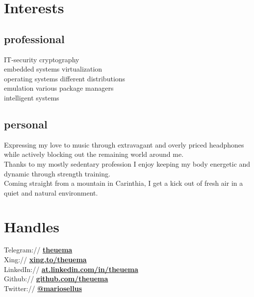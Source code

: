 \documentclass[]{resume}
\begin{document}
\begin{minipage}[t]{0.33\textwidth}
\section{Interests} 
	\subsection{professional}
	IT-security \textbullet{} cryptography\\
	embedded systems \textbullet{} virtualization\\
	operating systems \textbullet{} different distributions\\
	emulation \textbullet{} various package managers\\
	intelligent systems
	\sectionsep

	\subsection{personal}
	Expressing my love to music through extravagant and overly priced headphones while actively blocking out the remaining world around me. \\ \sectionsep
	Thanks to my mostly sedentary profession I enjoy keeping my body energetic and dynamic through strength training. \\ \sectionsep 
	Coming straight from a mountain in Carinthia, I get a kick out of fresh air in a quiet and natural environment. 
	\sectionsep
\section{Handles} 
	Telegram:// \href{https://telegram.me/theuema}{\textbf{theuema}} \\ \smallsep 
	Xing:// \href{https://www.xing.com/profile/Mario_Theuermann}{\textbf{xing.to/theuema}} \\ \smallsep 
	LinkedIn:// \href{https://www.linkedin.com/in/theuema}{\textbf{at.linkedin.com/in/theuema}} \\ \smallsep 
	Github:// \href{https://github.com/theuema}{\textbf{github.com/theuema}} \\ \smallsep 
	Twitter:// \href{https://twitter.com/mariosellus}{\textbf{@mariosellus}} \\ \smallsep 

\end{minipage}\quad %
\end{document}
